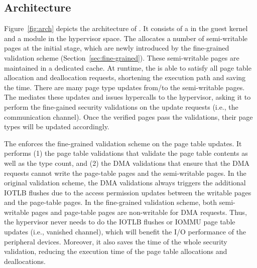 \subsection{\name Architecture}
Figure~\ref{fig:arch} depicts the architecture of \name. It consists of a \cache in the guest kernel and a \name module in the hypervisor space.
The \cache allocates a number of semi-writable pages at the initial stage,  which are newly introduced by the fine-grained validation scheme (Section~\ref{sec:fine-grained}).
These semi-writable pages are maintained in a dedicated cache.
At runtime, the \cache is able to satisfy all page table allocation and deallocation requests, shortening the execution path and saving the time.
There are many page type updates from/to the semi-writable pages.
The \cache mediates these updates and issues hypercalls to the hypervisor, asking it to perform the fine-gained security validations on the update requests (i.e., the communication channel).
Once the verified pages pass the validations, their page types will be updated accordingly.

The \module enforces the fine-grained validation scheme on the page table updates.
It performs (1) the page table validations that validate the page table contents as well as the type count, and (2) the DMA validations that ensure that the DMA requests cannot write the page-table pages and the semi-writable pages.
In the original validation scheme, the DMA validations always triggers the additional IOTLB flushes due to the access permission updates between the writable pages and the page-table pages.
In the fine-grained validation scheme, both semi-writable pages and page-table pages are non-writable for DMA requests.
Thus, the hypervisor never needs to do the IOTLB flushes or IOMMU page table updates (i.e., vanished channel), which will benefit the I/O performance of the peripheral devices.
Moreover, it also saves the time of the whole security validation, reducing the execution time of the page table allocations and deallocations.

